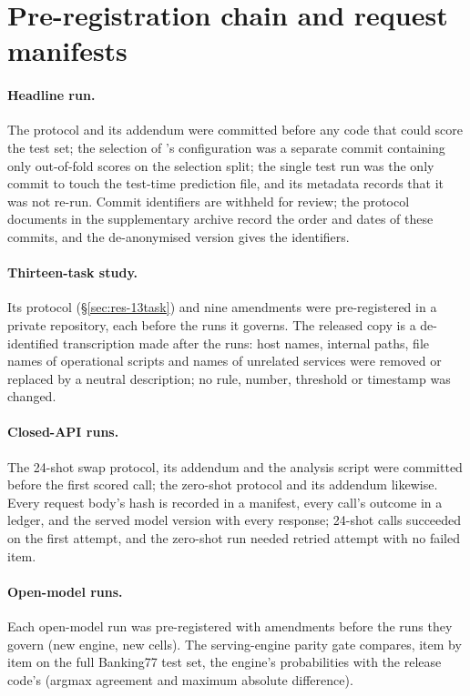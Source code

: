 \section{Pre-registration chain and request manifests}
\label{app:protocol}

\paragraph{Headline run.} The protocol and its addendum were committed before any code that could score the test
set; the selection of \orb's configuration was a separate commit containing only out-of-fold scores on the
selection split; the single test run was the only commit to touch the test-time prediction file, and its metadata
records that it was not re-run. Commit identifiers are withheld for review; the protocol documents in the
supplementary archive record the order and dates of these commits, and the de-anonymised version gives the
identifiers.

\paragraph{Thirteen-task study.} Its protocol (\S\ref{sec:res-13task}) and nine amendments were pre-registered in a
private repository, each before the runs it governs. The released copy is a de-identified transcription made after
the runs: host names, internal paths, file names of operational scripts and names of unrelated services were removed
or replaced by a neutral description; no rule, number, threshold or timestamp was changed.

\paragraph{Closed-API runs.} The 24-shot swap protocol, its addendum and the analysis script were committed before
the first scored call; the zero-shot protocol and its addendum likewise. Every request body's hash is recorded in a
manifest, every call's outcome in a ledger, and the served model version with every response; \fsJevFsCalls{} 24-shot calls succeeded on the first attempt, and the
zero-shot run needed \fsJevZsFailedAttempts{} retried attempt with no failed item.

\paragraph{Open-model runs.} Each open-model run was pre-registered with amendments before the runs they govern
(new engine, new cells). The serving-engine parity gate compares, item by item on the full Banking77 test set, the
engine's probabilities with the release code's (argmax agreement and maximum absolute difference).


